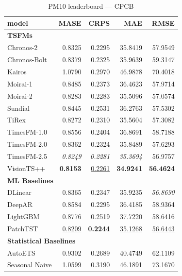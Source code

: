 \begin{table}[H]
\caption{PM10 leaderboard --- CPCB}
\centering
\begin{small}
\begin{tabular}{lrrrr}
\toprule
model & MASE & CRPS & MAE & RMSE \\
\midrule
\multicolumn{5}{l}{\textbf{TSFMs}} \\
Chronos-2 & 0.8325 & 0.2295 & 35.8419 & 57.9549 \\
Chronos-Bolt & 0.8379 & 0.2325 & 35.9639 & 59.3147 \\
Kairos & 1.0790 & 0.2970 & 46.9878 & 70.4018 \\
Moirai-1 & 0.8485 & 0.2373 & 36.4623 & 57.9714 \\
Moirai-2 & 0.8283 & 0.2283 & 35.5096 & 57.0574 \\
Sundial & 0.8445 & 0.2531 & 36.2763 & 57.5302 \\
TiRex & 0.8272 & 0.2310 & 35.5604 & 57.3082 \\
TimesFM-1.0 & 0.8556 & 0.2404 & 36.8691 & 58.7188 \\
TimesFM-2.0 & 0.8362 & 0.2324 & 35.8489 & 57.6293 \\
TimesFM-2.5 & \textit{0.8249} & \textit{0.2281} & \textit{35.3694} & 56.9757 \\
VisionTS++ & \textbf{0.8153} & \underline{0.2261} & \textbf{34.9241} & \textbf{56.4624} \\
\midrule
\multicolumn{5}{l}{\textbf{ML Baselines}} \\
DLinear & 0.8365 & 0.2347 & 35.9235 & \textit{56.8690} \\
DeepAR & 0.8584 & 0.2295 & 36.4185 & 58.9364 \\
LightGBM & 0.8776 & 0.2519 & 37.7220 & 58.6416 \\
PatchTST & \underline{0.8209} & \textbf{0.2244} & \underline{35.1268} & \underline{56.6443} \\
\midrule
\multicolumn{5}{l}{\textbf{Statistical Baselines}} \\
AutoETS & 0.9302 & 0.2689 & 40.4749 & 62.1109 \\
Seasonal Naive & 1.0599 & 0.3190 & 46.1891 & 73.1670 \\
\bottomrule
\end{tabular}
\end{small}
\end{table}